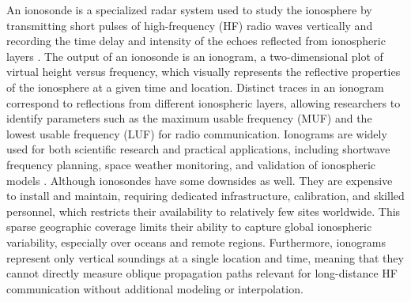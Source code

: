 \documentclass[signals,article,submit,pdftex,moreauthors]{Definitions/mdpi}
\begin{document}

An ionosonde is a specialized radar system used to study the ionosphere by
transmitting short pulses of high-frequency (HF) radio waves vertically and
recording the time delay and intensity of the echoes reflected from ionospheric
layers \cite{frissell2014ionospheric}.
The output of an ionosonde is an ionogram, a two-dimensional plot of virtual
height versus frequency, which visually represents the reflective properties of
the ionosphere at a given time and location. Distinct traces in an ionogram
correspond to reflections from different ionospheric layers, allowing
researchers to identify parameters such as the maximum usable frequency (MUF)
and the lowest usable frequency (LUF) for radio communication. Ionograms are
widely used for both scientific research and practical applications, including
shortwave frequency planning, space weather monitoring, and validation of
ionospheric models \cite{ivanov2003chirp, hundesa2024ionosonde}.
Although ionosondes have some downsides as well.
They are expensive to install and maintain, requiring dedicated
infrastructure, calibration, and skilled personnel, which restricts their
availability to relatively few sites worldwide. This sparse geographic coverage
limits their ability to capture global ionospheric variability, especially over
oceans and remote regions. Furthermore, ionograms represent only vertical
soundings at a single location and time, meaning that they cannot directly
measure oblique propagation paths relevant for long-distance HF communication
without additional modeling or interpolation.
\end{document}
